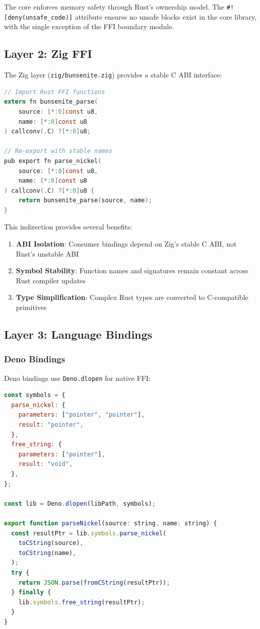 \documentclass[11pt,a4paper]{article}
\begin{document}
The core enforces memory safety through Rust's ownership model. The \texttt{\#![deny(unsafe\_code)]} attribute ensures no unsafe blocks exist in the core library, with the single exception of the FFI boundary module.

\subsection{Layer 2: Zig FFI}

The Zig layer (\texttt{zig/bunsenite.zig}) provides a stable C ABI interface:

\begin{lstlisting}[language=C,caption={Zig FFI exports (C ABI)}]
// Import Rust FFI functions
extern fn bunsenite_parse(
    source: [*:0]const u8,
    name: [*:0]const u8
) callconv(.C) ?[*:0]u8;

// Re-export with stable names
pub export fn parse_nickel(
    source: [*:0]const u8,
    name: [*:0]const u8
) callconv(.C) ?[*:0]u8 {
    return bunsenite_parse(source, name);
}
\end{lstlisting}

This indirection provides several benefits:

\begin{enumerate}
    \item \textbf{ABI Isolation}: Consumer bindings depend on Zig's stable C ABI, not Rust's unstable ABI
    \item \textbf{Symbol Stability}: Function names and signatures remain constant across Rust compiler updates
    \item \textbf{Type Simplification}: Complex Rust types are converted to C-compatible primitives
\end{enumerate}

\subsection{Layer 3: Language Bindings}

\subsubsection{Deno Bindings}

Deno bindings use \texttt{Deno.dlopen} for native FFI:

\begin{lstlisting}[language=JavaScript,caption={Deno FFI binding}]
const symbols = {
  parse_nickel: {
    parameters: ["pointer", "pointer"],
    result: "pointer",
  },
  free_string: {
    parameters: ["pointer"],
    result: "void",
  },
};

const lib = Deno.dlopen(libPath, symbols);

export function parseNickel(source: string, name: string) {
  const resultPtr = lib.symbols.parse_nickel(
    toCString(source),
    toCString(name),
  );
  try {
    return JSON.parse(fromCString(resultPtr));
  } finally {
    lib.symbols.free_string(resultPtr);
  }
}
\end{lstlisting}
\end{document}
